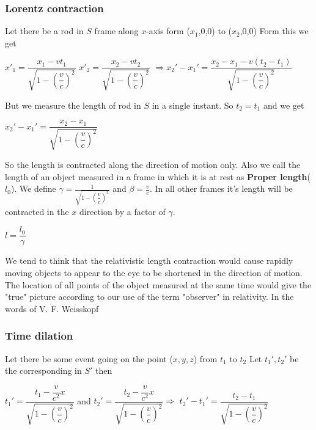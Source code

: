 \documentclass[12pt,a4paper]{article}
\numberwithin{table}{section}
\numberwithin{figure}{section}
\numberwithin{equation}{section}
\theoremstyle{remark}
\theoremstyle{definition}
\begin{document}
\subsubsection{Lorentz contraction}
Let there be a rod in $S$ frame along $x$-axis form ($x_1$,0,0) to ($x_2$,0,0)
Form this we get 
\begin{center}
$ x'_1=\dfrac{x_1-vt_1}{ \sqrt{1-(\dfrac{v}{c})^2}}$  $ x'_2=\dfrac{x_2-vt_2}{ \sqrt{1-(\dfrac{v}{c})^2}}$
$\Rightarrow x_2'-x_1'=\dfrac{x_2-x_1-v(t_2-t_1)}{\sqrt{1-(\dfrac{v}{c})^2}}$

\end{center}
But we measure the length of rod in $S$ in a single instant. So $t_2=t_1$ and we get
\begin{center}
$x_2'-x_1'=\dfrac{x_2-x_1}{\sqrt{1-(\dfrac{v}{c})^2}}$
\end{center}
So the length is contracted along the direction of motion only. Also we call the length of an object measured in a frame in which it is at rest as \textbf{Proper length}(\textbf{$l_0$}). We define $\gamma=\frac{1}{\sqrt{1-(\dfrac{v}{c})^2}}$ and $\beta=\frac{v}{c}$. In all other frames it's length will be contracted in the $x$ direction by a factor of $\gamma$.
\begin{center}
$l=\dfrac{l_0}{\gamma}$
\end{center}
We tend to think that the relativistic length contraction would cause rapidly moving objects to appear to the eye to be shortened in the direction of motion. The location of all points of the object measured at the same time would give the "true" picture according to our use of the term "observer" in relativity. In the words of V. F. Weisskopf



\subsubsection{Time dilation}
Let there be some event going on the point ($x,y,z$) from $t_1$ to $t_2$
Let $t_1',t_2'$ be the corresponding in $S'$ then
\begin{center}
$t_1' = \dfrac{t_1-\dfrac{v}{c^2}x}{\sqrt{1-(\dfrac{v}{c})^2}}$ and $t_2' = \dfrac{t_2-\dfrac{v}{c^2}x}{\sqrt{1-(\dfrac{v}{c})^2}} \Rightarrow$ $t_2'-t_1'= \dfrac{t_2-t_1}{\sqrt{1-(\dfrac{v}{c})^2}}$
\end{center}
\end{document}

